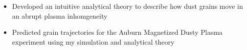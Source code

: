 \documentclass[12pt,a4paper,sans]{moderncv} %
\begin{document}
{\begin{itemize}
\item Developed an intuitive analytical theory to describe how dust grains move in an abrupt plasma inhomgeneity
\item Predicted grain trajectories for the Auburn Magnetized Dusty Plasma experiment using my simulation and analytical theory %
\end{itemize}
}



\end{document}
